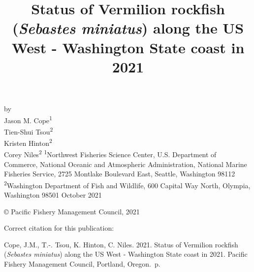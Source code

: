 \documentclass[11pt,
  english,
  a4paper,
]{article}
\date{}
\newcommand{\trTitle}{Status of Vermilion rockfish (\emph{Sebastes miniatus}) along the US West - Washington State coast in 2021}
\newcommand{\trYear}{2021}
\newcommand{\trMonth}{October}
\newcommand{\trAuthsBack}{Cope, J.M., T.-. Tsou, K. Hinton, C. Niles}
\newcommand{\trCitation}{
\begin{hangparas}{1em}{1}
\trAuthsBack{}. \trYear{}. \trTitle{}. Pacific Fishery Management Council, Portland, Oregon. \pageref{LastPage}{}\,p.
\end{hangparas}}
\begin{document}

\renewcommand*{\thefootnote}{\fnsymbol{footnote}}

\small
\thispagestyle{empty}
\noindent
\begin{center}
\title{Status of Vermilion rockfish (\emph{Sebastes miniatus}) along the US West - Washington State coast in 2021}
\vspace{1.5cm}
{\Large\textbf{}}
\vfill
by\\
Jason M. Cope\textsuperscript{1}\\
Tien-Shui Tsou\textsuperscript{2}\\
Kristen Hinton\textsuperscript{2}\\
Corey Niles\textsuperscript{2}\vfill
\textsuperscript{1}Northwest Fisheries Science Center, U.S. Department of Commerce, National Oceanic and Atmospheric Administration, National Marine Fisheries Service, 2725 Montlake Boulevard East, Seattle, Washington 98112\\
\textsuperscript{2}Washington Department of Fish and Wildlife, 600 Capital Way North, Olympia, Washington 98501\vfill
\trMonth{} \trYear{}
\end{center}
\clearpage

\thispagestyle{empty}
\vspace*{\fill}
\begin{center}
\copyright{} Pacific Fishery Management Council, \trYear{}\\
\end{center}
\par
\bigskip
\noindent
Correct citation for this publication:
\bigskip
\par
\trCitation{}
\clearpage


\tableofcontents\clearpage
\label{TRlastRoman}
\clearpage

\newpage
\thispagestyle{empty} %

\pagestyle{plain}  %
\renewcommand*{\thefootnote}{\arabic{footnote}}  %
\setcounter{footnote}{0}  %
\renewcommand{\headrulewidth}{0.5pt}
\renewcommand{\footrulewidth}{0.5pt}
\end{document}
